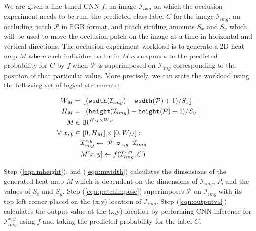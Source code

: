 We are given a fine-tuned CNN $f$, an image $\mathcal{I}_{img}$ on which the occlusion experiment needs to be run, the predicted class label $C$ for the image $\mathcal{I}_{img}$, an occluding patch $\mathcal{P}$ in RGB format, and patch striding amounts $S_{x}$ and $S_{y}$ which will be used to move the occlusion patch on the image at a time in horizontal and vertical directions. The occlusion experiment workload is to generate a 2D heat map $M$ where each individual value in $M$ corresponds to the predicted probability for $C$ by $f$ when $\mathcal{P}$ is superimposed on $\mathcal{I}_{img}$ corresponding to the position of that particular value. More precisely, we can state the workload using the following set of logical statements:


\begin{align}
\label{eqn:mheight}
W_M =&~ \lfloor(\texttt{width}(\mathcal{I}_{img}) - \texttt{width}(\mathcal{P}) + 1)/S_{x}\rfloor\\
\label{eqn:mwidth}
H_M =&~ \lfloor(\texttt{height}(\mathcal{I}_{img}) - \texttt{height}(\mathcal{P}) + 1)/S_{y}\rfloor\\
M \in&~ \mathcal{\rm I\!R}^{H_M \times W_M}\\
\forall~ x,y \in&~ [0, H_M] \times [0, W_M]:\\
\label{eqn:patchimpose}
& \mathcal{I}_{img}^{x,y} \leftarrow ~\mathcal{P} ~ \bm\circ_{x,y} ~ \mathcal{I}_{img}\\
\label{eqn:outputval}
& M[x,y] \leftarrow f(\mathcal{I}_{img}^{x,y},C)
\end{align}

Step (\ref{eqn:mheight}), and (\ref{eqn:mwidth}) calculates the dimensions of the generated heat map $M$ which is dependent on the dimensions of $\mathcal{I}_{img}$, $P$, and the values of $S_{x}$ and $S_{y}$.
Step (\ref{eqn:patchimpose}) superimposes $\mathcal{P}$ on $\mathcal{I}_{img}$ with its top left corner placed on the (x,y) location of $\mathcal{I}_{img}$.
Step (\ref{eqn:outputval}) calculates the output value at the (x,y) location by performing CNN inference for $\mathcal{I}_{img}^{x,y}$ using $f$ and taking the predicted probability for the label $C$.

